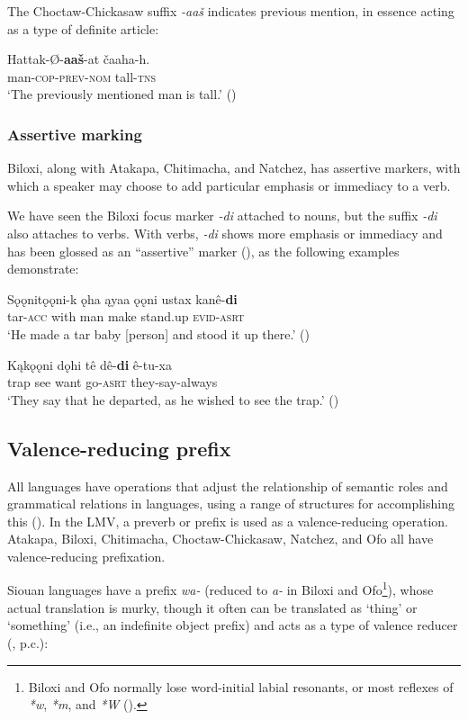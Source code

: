 \documentclass[output=paper]{LSP/langsci}
\begin{document}
	The Choctaw-Chickasaw suffix \emph{-aaš} indicates previous mention, in essence acting as a type of definite article:

\ea
\gll	Hattak-Ø-\textbf{aaš}-at čaaha-h.\\
	man-\textsc{cop-prev-nom} tall-\textsc{tns} \\
\glt `The previously mentioned man is tall.' 
(\citealt[89]{Broadwell2006})
\z

\subsubsection{Assertive marking}

Biloxi, along with Atakapa, Chitimacha, and Natchez, has assertive markers, with which a speaker may choose to add particular emphasis or immediacy to a verb. 

	We have seen the Biloxi focus marker \emph{-di} attached to nouns, but the suffix \emph{-di} also attaches to verbs. With verbs, \emph{-di} shows more emphasis or immediacy and has been glossed as an “assertive” marker (\citealt[3]{Kaufman2011}), as the following examples demonstrate:

\ea
\gll	Sǫǫnitǫǫni-k ǫha ąyaa ǫǫni ustax kanê-\textbf{di} \\
	tar-\textsc{acc}  with man make stand.up \textsc{evid-asrt}\\
\glt `He made a tar baby [person] and stood it up there.' (\citealt[13]{DorseySwanton1912})
\z

\ea
\gll	Kąkǫǫni dǫhi tê dê-\textbf{di} ê-tu-xa\\
	trap 	 see want go-\textsc{asrt} they-say-always\\
\glt `They say that he departed, as he wished to see the trap.' (\citealt[184]{DorseySwanton1912})
\z

\subsection{Valence-reducing prefix}

All languages have operations that adjust the relationship of semantic roles and grammatical relations in languages, using a range of structures for accomplishing this (\citealt[169]{Payne1997}). In the LMV, a preverb or prefix is used as a valence-reducing operation. Atakapa, Biloxi, Chitimacha, Choctaw-Chickasaw, Natchez, and Ofo all have valence-reducing prefixation. 	

	Siouan languages have a prefix \emph{wa-} (reduced to \emph{a-} in Biloxi and Ofo\footnote{Biloxi and Ofo normally lose word-initial labial resonants, or most reflexes of \emph{*w}, \emph{*m}, and \emph{*W} (\citealt[19]{Rankin2002}).}), whose actual translation is murky, though it often can be translated as `thing' or `something' (i.e., an indefinite object prefix) and acts as a type of valence reducer (\citealt[3]{Rankin2013}, p.c.):
\end{document}
